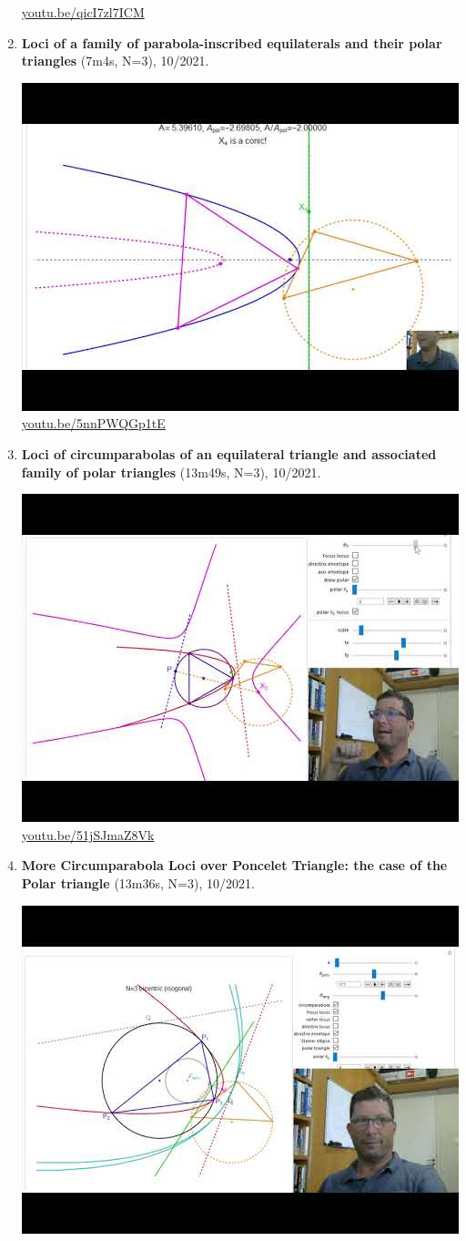 \documentclass[12pt]{amsart}
\begin{document}
\begin{enumerate}[resume]
\begin{center}
\href{https://youtu.be/qicI7zl7ICM}{\url{youtu.be/qicI7zl7ICM}}\end{center}
% 
\item \textbf{Loci of a family of parabola-inscribed equilaterals and their polar triangles} (7m4s, N=3), 10/2021. 
\begin{center}\includegraphics[width=.5\textwidth]{pics/5nnPWQGp1tE.jpg} \\ 
\href{https://youtu.be/5nnPWQGp1tE}{\url{youtu.be/5nnPWQGp1tE}}\end{center}
% 
\item \textbf{Loci of circumparabolas of an equilateral triangle and associated family of polar triangles} (13m49s, N=3), 10/2021. 
\begin{center}\includegraphics[width=.5\textwidth]{pics/51jSJmaZ8Vk.jpg} \\ 
\href{https://youtu.be/51jSJmaZ8Vk}{\url{youtu.be/51jSJmaZ8Vk}}\end{center}
% 
\item \textbf{More Circumparabola Loci over Poncelet Triangle: the case of the Polar triangle} (13m36s, N=3), 10/2021. 
\begin{center}\includegraphics[width=.5\textwidth]{pics/tTTIs_zxU3U.jpg} \\ 

\end{center}
\end{enumerate}
\end{document}
